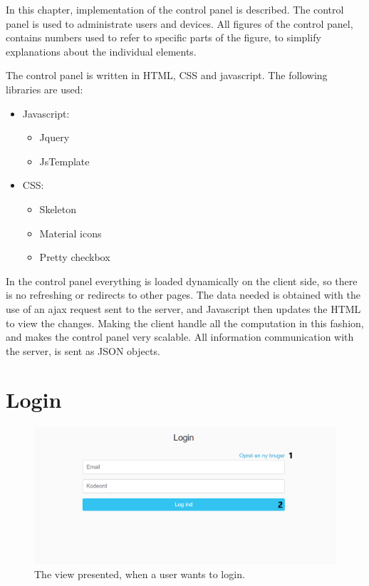 In this chapter, implementation of the control panel is described. The control panel is used to administrate users and devices. All figures of the control panel, contains numbers used to refer to specific parts of the figure, to simplify explanations about the individual elements.

The control panel is written in HTML, CSS and javascript. The following libraries are used:
\begin{itemize}
    \item Javascript:
        \begin{itemize}
            \item Jquery\cite{controlPanel:Jquery}
            \item JsTemplate\cite{controlPanel:JsTemplates}
        \end{itemize}
    \item CSS:
        \begin{itemize}
            \item Skeleton\cite{controlPanel:Skeleton}
            \item Material icons\cite{controlPanel:MaterialIcons}
            \item Pretty checkbox\cite{controlPanel:PrettyCheckbox}
        \end{itemize}
\end{itemize}

In the control panel everything is loaded dynamically on the client side, so there is no refreshing or redirects to other pages. The data needed is obtained with the use of an ajax request sent to the server, and Javascript then updates the HTML to view the changes. Making the client handle all the computation in this fashion, and makes the control panel very scalable.
All information communication with the server, is sent as JSON objects.


\section{Login}
\begin{figure}[H]
    \centering
    \includegraphics[scale=0.4]{Figures/ControlPanel/LoginView.png}
    \caption{The view presented, when a user wants to login.}
    \label{fig:controlPanelLoginView}
\end{figure}

